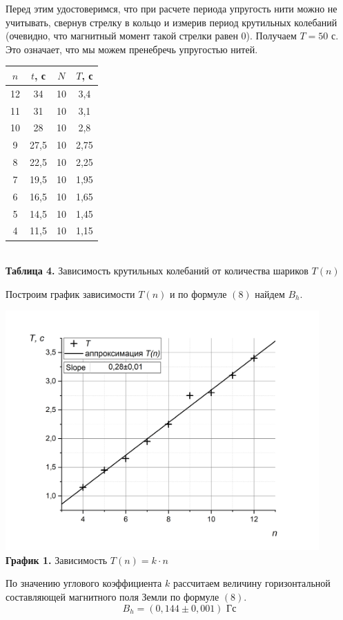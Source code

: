 \documentclass[a4paper, 12pt]{article}%
\begin{document}
Перед этим удостоверимся, что при расчете периода упругость нити можно не учитывать, свернув стрелку в кольцо и измерив период крутильных колебаний (очевидно, что магнитный момент такой стрелки равен 0). Получаем $T = 50$ с. Это означает, что мы можем пренебречь упругостью нитей.
\begin{center}
\begin{tabular}{|c|c|c|c|}
\hline
$n$ & $t$, с & $N$ & $T$, с \\ \hline
12 & 34 & 10 & 3,4 \\ \hline
11 & 31 & 10 & 3,1 \\ \hline
10 & 28 & 10 & 2,8 \\ \hline
9 & 27,5 & 10 & 2,75 \\ \hline
8 & 22,5 & 10 & 2,25 \\ \hline
7 & 19,5 & 10 & 1,95 \\ \hline
6 & 16,5 & 10 & 1,65 \\ \hline
5 & 14,5 & 10 & 1,45 \\ \hline
4 & 11,5 & 10 & 1,15 \\ \hline
\end{tabular}\\
\textbf{Таблица 4. } Зависимость крутильных колебаний от количества шариков $T(n)$
\end{center}
Построим график зависимости $T(n)$ и по формуле $(8)$ найдем $B_h$.\\
\begin{center}
\includegraphics[width = 0.9\textwidth]{2.jpg}\\
\textbf{График 1. } Зависимость $T(n) = k \cdot n$
\end{center}
По значению углового коэффициента $k$ рассчитаем величину горизонтальной составляющей магнитного поля Земли по формуле $(8)$.
\[B_h = (0,144 \pm 0,001) \text{ Гс}\]
\end{document}
